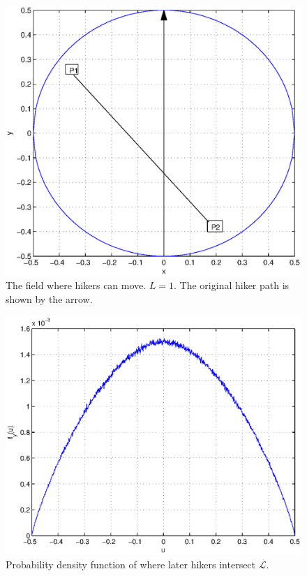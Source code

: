 \begin{figure}
\centering
\includegraphics[width=4.5in]{Chapter_2_Figures/hiker_circle.eps}
\caption{The field where hikers can move.  $L = 1$.  The original hiker path is shown by the arrow.}
\label{Figure: hiker_circle.eps}
\end{figure}
\begin{figure}
\centering
\includegraphics[width=4.5in]{Chapter_2_Figures/hiker_pdf.eps}
\caption{Probability density function of where later hikers intersect $\mathcal{L}$.}
\label{Figure: hiker_pdf.eps}
\end{figure}
\clearpage

